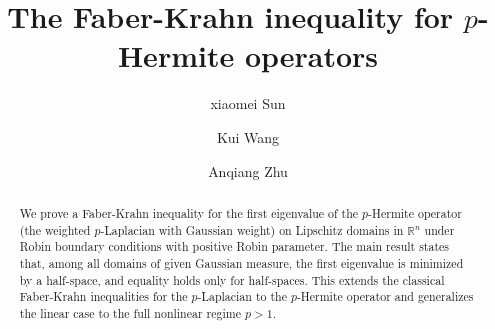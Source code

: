 \documentclass[11pt,leqno]{amsart}
\def\R{\mathbb{R}}
\numberwithin{equation}{section}
\begin{document}
\title[The Faber-Krahn inequality]{The Faber-Krahn inequality for $p$-Hermite operators}

\author{xiaomei Sun} 
\address{College of informatics, Huazhong Agricultural University, 430070, Wuhan, China}


\author{Kui Wang} 
\address{School of Mathematical Sciences, Soochow University, Suzhou, 215006, China}

\author{Anqiang Zhu} 
\address{School of Mathematics and Statistics, Wuhan University, Wuhan 430072, China}





\begin{abstract}
We prove a Faber-Krahn  inequality for the first eigenvalue of the $p$-Hermite operator (the weighted $p$-Laplacian with Gaussian weight) on Lipschitz domains in $\R^n$ under  Robin boundary conditions with positive Robin parameter. The main result states that, among all domains of given Gaussian measure, the first eigenvalue is minimized by a half-space, and equality holds only for half-spaces. This extends the classical Faber-Krahn inequalities for the $p$-Laplacian \cite{BucurCV} to the $p$-Hermite operator and generalizes the linear case \cite{ChiacchioMathann}  to the full nonlinear regime $p>1$.
\end{abstract}
\maketitle
\end{document}

